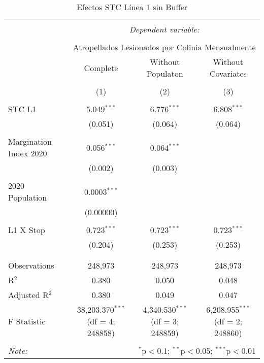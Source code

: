 
\begin{table}[!htbp] \centering 
  \caption{Efectos STC Línea 1 sin Buffer} 
  \label{} 
\begin{tabular}{@{\extracolsep{5pt}}lccc} 
\\[-1.8ex]\hline 
\hline \\[-1.8ex] 
 & \multicolumn{3}{c}{\textit{Dependent variable:}} \\ 
\cline{2-4} 
\\[-1.8ex] & \multicolumn{3}{c}{Atropellados Lesionados por Colinia Mensualmente} \\ 
 & Complete & Without Populaton & Without Covariates \\ 
\\[-1.8ex] & (1) & (2) & (3)\\ 
\hline \\[-1.8ex] 
 STC L1 & 5.049$^{***}$ & 6.776$^{***}$ & 6.808$^{***}$ \\ 
  & (0.051) & (0.064) & (0.064) \\ 
  & & & \\ 
 Margination Index 2020 & 0.056$^{***}$ & 0.064$^{***}$ &  \\ 
  & (0.002) & (0.003) &  \\ 
  & & & \\ 
 2020 Population & 0.0003$^{***}$ &  &  \\ 
  & (0.00000) &  &  \\ 
  & & & \\ 
 L1 X Stop & 0.723$^{***}$ & 0.723$^{***}$ & 0.723$^{***}$ \\ 
  & (0.204) & (0.253) & (0.253) \\ 
  & & & \\ 
\hline \\[-1.8ex] 
Observations & 248,973 & 248,973 & 248,973 \\ 
R$^{2}$ & 0.380 & 0.050 & 0.048 \\ 
Adjusted R$^{2}$ & 0.380 & 0.049 & 0.047 \\ 
F Statistic & 38,203.370$^{***}$ (df = 4; 248858) & 4,340.530$^{***}$ (df = 3; 248859) & 6,208.955$^{***}$ (df = 2; 248860) \\ 
\hline 
\hline \\[-1.8ex] 
\textit{Note:}  & \multicolumn{3}{r}{$^{*}$p$<$0.1; $^{**}$p$<$0.05; $^{***}$p$<$0.01} \\ 
\end{tabular} 
\end{table} 
